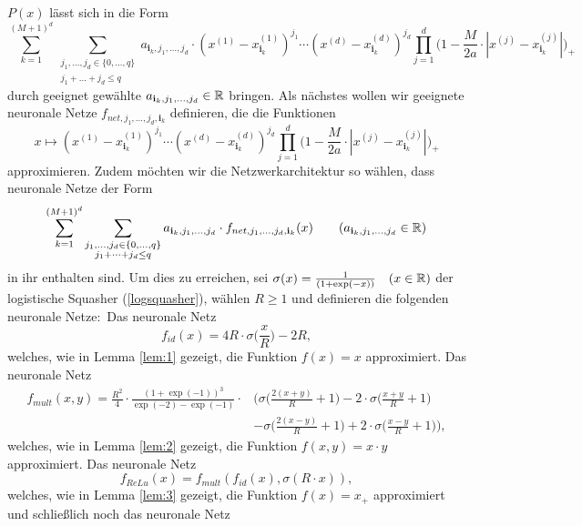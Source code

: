 $P(x)$ lässt sich in die Form 
$$\sum_{k = 1}^{(M + 1)^d} \sum_{\substack{ j_1,\dots,j_d \in \{0,\dots,q\} \\j_1+\dots +j_d \leq q}} a_{\mathbf{i}_k,j_1,\dots,j_d} \cdot (x^{(1)} - x_{\mathbf{i}_k}^{(1)})^{j_1} \cdots (x^{(d)} - x_{\mathbf{i}_k}^{(d)})^{j_d} \prod_{j = 1}^d \bigg(1 - \frac{M}{2a} \cdot |x^{(j)} - x_{\mathbf{i}_k}^{(j)}|\bigg)_+$$
durch geeignet gewählte $a_{\mathbf{i}_k,j_1,\dots,j_d} \in \mathbb{R}$ bringen.
Als nächstes wollen wir geeignete neuronale Netze $f_{net,j_1,\dots,j_d,\mathbf{i}_k}$ definieren, die die Funktionen
$$x \mapsto (x^{(1)} - x_{\mathbf{i}_k}^{(1)})^{j_1} \cdots (x^{(d)} - x_{\mathbf{i}_k}^{(d)})^{j_d} \prod_{j = 1}^d \bigg(1 - \frac{M}{2a} \cdot |x^{(j)} - x_{\mathbf{i}_k}^{(j)}|\bigg)_+$$ approximieren. Zudem möchten wir die Netzwerkarchitektur so wählen, dass neuronale Netze der Form
$$\sum_{k = 1}^{(M + 1)^d} \sum_{\substack{ j_1,\dots,j_d \in \{0,\dots,q\} \\j_1+\dots +j_d \leq q}} a_{\mathbf{i}_k,j_1,\dots,j_d} \cdot f_{net,j_1,\dots,j_d,\mathbf{i}_k}(x) \qquad (a_{\mathbf{i}_k,j_1,\dots,j_d} \in \mathbb{R})$$ in ihr enthalten sind.
Um dies zu erreichen, sei $\sigma(x) = \frac{1}{(1 + \exp(-x))} \quad (x \in \mathbb{R})$ der logistische Squasher (\ref{logsquasher}), wählen $R \geq 1$ und definieren die folgenden neuronale Netze$\colon$
Das neuronale Netz
\begin{equation}
\label{def:fid}
f_{id}(x) = 4R \cdot \sigma\Big(\frac{x}{R}\Big) - 2R,
\end{equation}
welches, wie in Lemma \ref{lem:1} gezeigt, die Funktion $f(x) = x$ approximiert. 
Das neuronale Netz 
\begin{equation}
\label{def:fmult}
\begin{split}
f_{mult}(x, y) = \frac{R^2}{4} \cdot \frac{(1 + \exp(- 1))^3}{\exp(-2) - \exp(-1)} \cdot & \bigg(\sigma\Big(\frac{2(x + y)}{R} + 1\Big) - 2 \cdot \sigma \Big(\frac{x + y}{R} + 1\Big) \\
& - \sigma\Big(\frac{2(x - y)}{R} + 1\Big) + 2 \cdot \sigma\Big(\frac{x - y}{R} + 1\Big)\bigg),
\end{split}
\end{equation}
welches, wie in Lemma \ref{lem:2} gezeigt, die Funktion $f(x, y) = x \cdot y$ approximiert. Das neuronale Netz 
\begin{equation}
\label{def:frelu}
f_{ReLu}(x) = f_{mult}(f_{id}(x), \sigma(R \cdot x)),
\end{equation}
welches, wie in Lemma \ref{lem:3} gezeigt, die Funktion $f(x) = x_+$ approximiert und schließlich noch das neuronale Netz 
